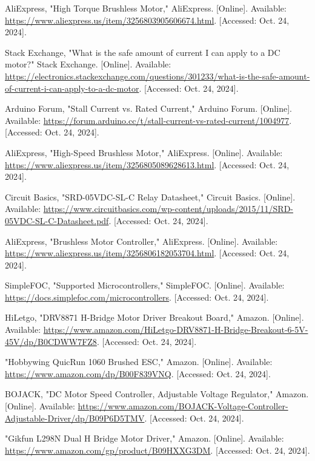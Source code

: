 \begin{thebibliography}{45}
	AliExpress, "High Torque Brushless Motor," AliExpress. [Online]. Available: \url{https://www.aliexpress.us/item/3256803905606674.html}. [Accessed: Oct. 24, 2024]. 
	
	Stack Exchange, "What is the safe amount of current I can apply to a DC motor?" Stack Exchange. [Online]. Available: \url{https://electronics.stackexchange.com/questions/301233/what-is-the-safe-amount-of-current-i-can-apply-to-a-dc-motor}. [Accessed: Oct. 24, 2024]. 
	
	Arduino Forum, "Stall Current vs. Rated Current," Arduino Forum. [Online]. Available: \url{https://forum.arduino.cc/t/stall-current-vs-rated-current/1004977}. [Accessed: Oct. 24, 2024]. 
	
	AliExpress, "High-Speed Brushless Motor," AliExpress. [Online]. Available: \url{https://www.aliexpress.us/item/3256805089628613.html}. [Accessed: Oct. 24, 2024]. 
	
	Circuit Basics, "SRD-05VDC-SL-C Relay Datasheet," Circuit Basics. [Online]. Available: \url{https://www.circuitbasics.com/wp-content/uploads/2015/11/SRD-05VDC-SL-C-Datasheet.pdf}. [Accessed: Oct. 24, 2024]. 
	
	AliExpress, "Brushless Motor Controller," AliExpress. [Online]. Available: \url{https://www.aliexpress.us/item/3256806182053704.html}. [Accessed: Oct. 24, 2024]. 
	
	SimpleFOC, "Supported Microcontrollers," SimpleFOC. [Online]. Available: \url{https://docs.simplefoc.com/microcontrollers}. [Accessed: Oct. 24, 2024]. 
	
	HiLetgo, "DRV8871 H-Bridge Motor Driver Breakout Board," Amazon. [Online]. Available: \url{https://www.amazon.com/HiLetgo-DRV8871-H-Bridge-Breakout-6-5V-45V/dp/B0CDWW7FZ8}. [Accessed: Oct. 24, 2024]. 
	
	"Hobbywing QuicRun 1060 Brushed ESC," Amazon. [Online]. Available: \url{https://www.amazon.com/dp/B00F839VNQ}. [Accessed: Oct. 24, 2024]. 
	
	BOJACK, "DC Motor Speed Controller, Adjustable Voltage Regulator," Amazon. [Online]. Available: \url{https://www.amazon.com/BOJACK-Voltage-Controller-Adjustable-Driver/dp/B09P6D5TMV}. [Accessed: Oct. 24, 2024]. 
	
	"Gikfun L298N Dual H Bridge Motor Driver," Amazon. [Online]. Available: \url{https://www.amazon.com/gp/product/B09HXXG3DM}. [Accessed: Oct. 24, 2024]. 
	

\end{thebibliography}
